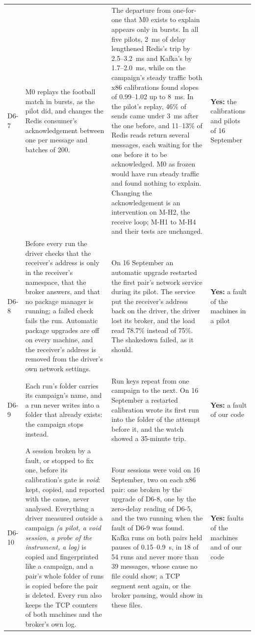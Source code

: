 \documentclass[11pt]{article}
\newcommand{\gl}[1]{{\color{soft}\itshape\small (#1)}}
\begin{document}
{\begin{longtable}{@{}p{1.0cm} >{\raggedright\arraybackslash}p{6.2cm} >{\raggedright\arraybackslash}p{6.0cm} >{\raggedright\arraybackslash}p{2.2cm}@{}}
D6-7 & M0 replays the football match in bursts, as the pilot did, and changes the Redis consumer's acknowledgement between one per message and batches of 200. & The departure from one-for-one that M0 exists to explain appears only in bursts. In all five pilots, 2~ms of delay lengthened Redis's trip by 2.5--3.2~ms and Kafka's by 1.7--2.0~ms, while on the campaign's steady traffic both x86 calibrations found slopes of 0.99--1.02 up to 8~ms. In the pilot's replay, 46\% of sends came under 3~ms after the one before, and 11--13\% of Redis reads return several messages, each waiting for the one before it to be acknowledged. M0 as frozen would have run steady traffic and found nothing to explain. Changing the acknowledgement is an intervention on M-H2, the receive loop; M-H1 to M-H4 and their tests are unchanged. & \textbf{Yes:} the calibrations and pilots of 16 September \\
D6-8 & Before every run the driver checks that the receiver's address is only in the receiver's namespace, that the broker answers, and that no package manager is running; a failed check fails the run. Automatic package upgrades are off on every machine, and the receiver's address is removed from the driver's own network settings. & On 16 September an automatic upgrade restarted the first pair's network service during its pilot. The service put the receiver's address back on the driver, the driver lost its broker, and the load read 78.7\% instead of 75\%. The shakedown failed, as it should. & \textbf{Yes:} a fault of the machines in a pilot \\
D6-9 & Each run's folder carries its campaign's name, and a run never writes into a folder that already exists: the campaign stops instead. & Run keys repeat from one campaign to the next. On 16 September a restarted calibration wrote its first run into the folder of the attempt before it, and the watch showed a 35-minute trip. & \textbf{Yes:} a fault of our code \\
D6-10 & A session broken by a fault, or stopped to fix one, before its calibration's gate is \emph{void}: kept, copied, and reported with the cause, never analysed. Everything a driver measured outside a campaign \gl{a pilot, a void session, a probe of the instrument, a log} is copied and fingerprinted like a campaign, and a pair's whole folder of runs is copied before the pair is deleted. Every run also keeps the TCP counters of both machines and the broker's own log. & Four sessions were void on 16 September, two on each x86 pair: one broken by the upgrade of D6-8, one by the zero-delay reading of D6-5, and the two running when the fault of D6-9 was found. Kafka runs on both pairs held pauses of 0.15--0.9~s, in 18 of 54 runs and never more than 39 messages, whose cause no file could show; a TCP segment sent again, or the broker pausing, would show in these files. & \textbf{Yes:} faults of the machines and of our code \\

\end{longtable}}
\end{document}
